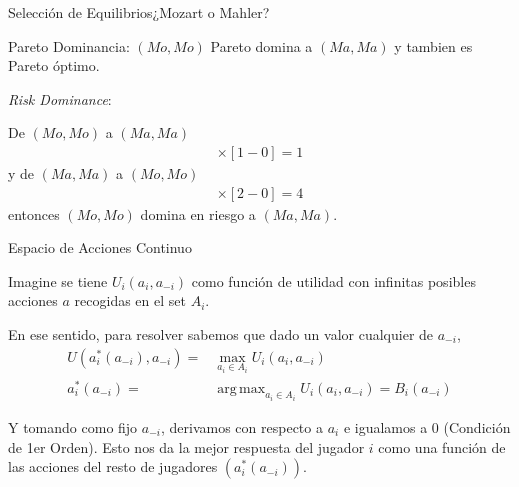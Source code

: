 \documentclass[notes, 11pt]{beamer} %
\newenvironment{wideitemize}{\itemize\addtolength{\itemsep}{10pt}}{\enditemize}
\DeclareMathOperator*{\argmax}{arg\,max}
\begin{document}
\begin{frame}{Selecci\'on de Equilibrios}{¿Mozart o Mahler?}
\begin{wideitemize}
	\item<1-> Pareto Dominancia: $(Mo,Mo)$ Pareto domina a $(Ma,Ma)$ y tambien es Pareto \'optimo.

	\item<2-> \textit{Risk Dominance}: 
	\begin{wideitemize}
		\item<3->[--] De $(Mo,Mo)$ a $(Ma,Ma)$
		\begin{align*}
			[1 - 0] \times [1 - 0] = 1
		\end{align*} y de $(Ma,Ma)$ a $(Mo,Mo)$
		\begin{align*}
			[2 - 0] \times [2 - 0] = 4
		\end{align*} entonces $(Mo,Mo)$ domina en riesgo a $(Ma,Ma)$.
	\end{wideitemize}
\end{wideitemize}

\end{frame}

\begin{frame}{Espacio de Acciones Continuo}
\begin{wideitemize}
	\item<1-> Imagine se tiene $U_{i}(a_{i},a_{-i})$ como funci\'on de utilidad con infinitas posibles acciones $a$ recogidas en el set $A_{i}$.
	\item<2-> En ese sentido, para resolver sabemos que dado un valor cualquier de $a_{-i}$,
	\begin{align*}
		U\left( a_{i}^{*}\left(a_{-i}\right), a_{-i}  \right) = & \max _{ a_{i} \in A_{i} } U_{i}\left( a_{i}, a_{-i} \right) \\
		a_{i}^{*}\left(a_{-i}\right) =& \argmax _{ a_{i} \in A_{i} } U_{i}\left( a_{i}, a_{-i} \right) = B_{i} \left( a_{-i} \right)
	\end{align*}
	\item<3-> Y tomando como fijo $a_{-i}$, derivamos con respecto a $a_{i}$ e igualamos a $0$ (Condici\'on de 1er Orden). Esto nos da la mejor respuesta del jugador $i$  como una funci\'on de las acciones del resto de jugadores $\left( a_{i}^{*}\left(a_{-i}\right)  \right)$. 
\end{wideitemize}
\end{frame}
\end{document}
